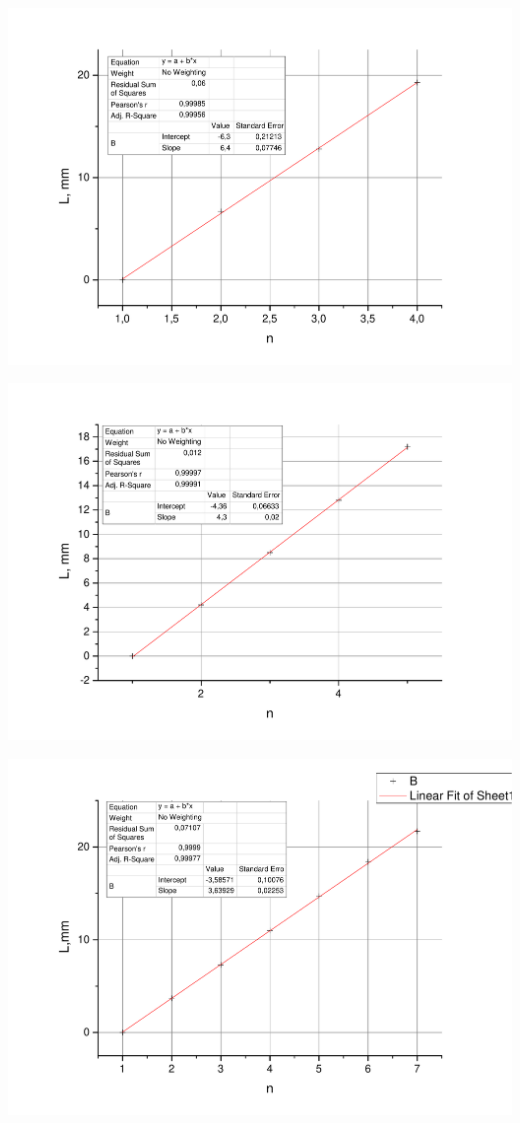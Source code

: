 \documentclass[a4paper,12pt]{article}
\begin{document}
		\includegraphics[width = 0.9\linewidth]{Graph2co2}
		
		\includegraphics[width = 0.9\linewidth]{Graph3co2}
		
		\includegraphics[width = 0.9\linewidth]{Graph4co2}
		
\end{document}
